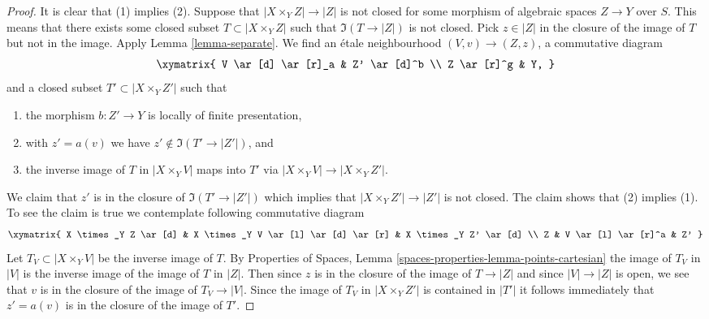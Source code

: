 \begin{proof}
It is clear that (1) implies (2).
Suppose that $|X \times_Y Z| \to |Z|$ is not closed for some
morphism of algebraic spaces $Z \to Y$ over $S$. This means that there
exists some closed subset $T \subset |X \times_Y Z|$
such that $\Im(T \to |Z|)$ is not closed. Pick $z \in |Z|$
in the closure of the image of $T$ but not in the image.
Apply Lemma \ref{lemma-separate}.
We find an \'etale neighbourhood $(V, v) \to (Z, z)$, a commutative diagram
$$
\xymatrix{
V \ar[d] \ar[r]_a & Z' \ar[d]^b \\
Z \ar[r]^g & Y,
}
$$
and a closed subset $T' \subset |X \times_Y Z'|$ such that
\begin{enumerate}
\item the morphism $b : Z' \to Y$ is locally of finite presentation,
\item with $z' = a(v)$ we have $z' \not \in \Im(T' \to |Z'|)$, and
\item the inverse image of $T$ in $|X \times_Y V|$ maps into $T'$ via
$|X \times_Y V| \to |X \times_Y Z'|$.
\end{enumerate}
We claim that $z'$ is in the closure of $\Im(T' \to |Z'|)$
which implies that $|X \times_Y Z'| \to |Z'|$ is not closed.
The claim shows that (2) implies (1).
To see the claim is true we contemplate
following commutative diagram
$$
\xymatrix{
X \times_Y Z \ar[d] &
X \times_Y V \ar[l] \ar[d] \ar[r] &
X \times_Y Z' \ar[d] \\
Z & V \ar[l] \ar[r]^a & Z'
}
$$
Let $T_V \subset |X \times_Y V|$ be the inverse image of $T$.
By Properties of Spaces, Lemma \ref{spaces-properties-lemma-points-cartesian}
the image of $T_V$ in $|V|$ is the inverse image of the image
of $T$ in $|Z|$. Then since $z$ is in the closure of the image of
$T \to |Z|$ and since $|V| \to |Z|$ is open, we see that $v$ is in
the closure of the image of $T_V \to |V|$. Since the image of
$T_V$ in $|X \times_Y Z'|$ is contained in $|T'|$ it follows
immediately that $z' = a(v)$ is in the closure of the image of $T'$.


\end{proof}
